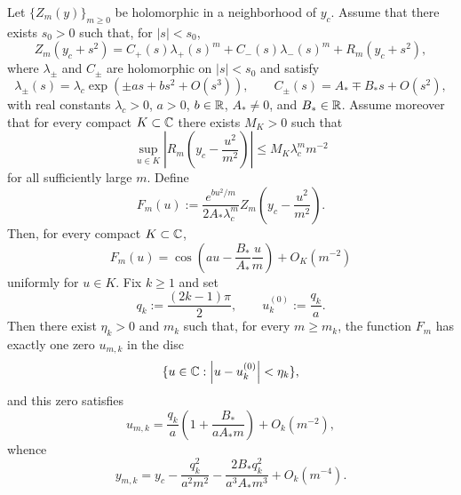 \begin{lemma}\label{lem:ep2-cosine-law}
Let \(\{Z_m(y)\}_{m\ge 0}\) be holomorphic in a neighborhood of \(y_c\).
Assume that there exists \(s_0>0\) such that, for \(|s|<s_0\),
\[
Z_m(y_c+s^2)=C_+(s)\lambda_+(s)^m + C_-(s)\lambda_-(s)^m + R_m(y_c+s^2),
\]
where \(\lambda_\pm\) and \(C_\pm\) are holomorphic on \(|s|<s_0\) and satisfy
\[
\lambda_\pm(s)=\lambda_c\exp\!\left(\pm as + bs^2 + O(s^3)\right),
\qquad
C_\pm(s)=A_*\mp B_*s+O(s^2),
\]
with real constants \(\lambda_c>0\), \(a>0\), \(b\in\mathbb{R}\), \(A_*\neq 0\), and \(B_*\in\mathbb{R}\).
Assume moreover that for every compact \(K\subset\mathbb{C}\) there exists \(M_K>0\) such that
\[
\sup_{u\in K}
\left|
R_m\!\left(y_c-\frac{u^2}{m^2}\right)
\right|
\le M_K \lambda_c^m m^{-2}
\]
for all sufficiently large \(m\).
Define
\[
F_m(u):=
\frac{e^{b u^2/m}}{2A_*\lambda_c^m}
Z_m\!\left(y_c-\frac{u^2}{m^2}\right).
\]
Then, for every compact \(K\subset\mathbb{C}\),
\begin{equation}\label{eq:universal-ep2-scaling}
F_m(u)
=
\cos\!\left(
a u-\frac{B_*}{A_*}\frac{u}{m}
\right)+O_K(m^{-2})
\end{equation}
uniformly for \(u\in K\).
Fix \(k\ge 1\) and set
\[
q_k:=\frac{(2k-1)\pi}{2},
\qquad
u_k^{(0)}:=\frac{q_k}{a}.
\]
Then there exist \(\eta_k>0\) and \(m_k\) such that, for every \(m\ge m_k\), the function \(F_m\) has exactly one zero \(u_{m,k}\) in the disc
\[
\{u\in\mathbb{C}:\left\lvert u-u_k^{(0)}\right\rvert<\eta_k\},
\]
and this zero satisfies
\begin{equation}\label{eq:universal-ep2-u}
u_{m,k}
=
\frac{q_k}{a}
\left(
1+\frac{B_*}{aA_*m}
\right)
+O_k(m^{-2}),
\end{equation}
whence
\begin{equation}\label{eq:universal-ep2-y}
y_{m,k}
=
y_c-\frac{q_k^2}{a^2m^2}
-\frac{2B_*q_k^2}{a^3A_*m^3}
+O_k(m^{-4}).
\end{equation}
\end{lemma}

